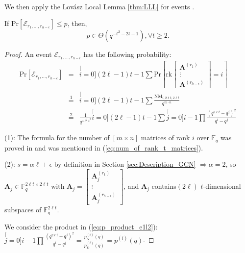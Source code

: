 We then apply the Lov\'asz Local Lemma \ref{thm:LLL} for events
.
\begin{lem}
\label{lem:p_e1l2} If $\mathrm{Pr}\left[\mathcal{E}_{r_{1},\ldots,r_{h-\epsilon}}\right]\leq p$,
then,
\[
p\in\Theta\left(q^{-t^{2}-2t-1}\right),\forall t\geq2.
\]
\end{lem}
\begin{proof}
An event $\mathcal{E}_{r_{1},\ldots,r_{h-\epsilon}}$ has the following
probability:
\begin{eqnarray}
\mathrm{Pr}\left[\mathcal{E}_{r_{1},\ldots,r_{h-\epsilon}}\right] & = & \stackrel[i=0]{\left(2\ell-1\right)t-1}{\mathop{\sum}}\mathrm{Pr}\left[\mathrm{rk}\left[\begin{array}{c}
\boldsymbol{A}^{\left(r_{1}\right)}\\
\vdots\\
\boldsymbol{A}^{\left(r_{h-\epsilon}\right)}
\end{array}\right]=i\right]\nonumber \\
 & \overset{1}{=} & \stackrel[i=0]{\left(2\ell-1\right)t-1}{\mathop{\sum}}\frac{\mathrm{NM}_{i,2\ell t,2\ell t}}{q^{m\cdot n}}\nonumber \\
 & \overset{2}{=} & \frac{1}{q^{4\ell^{2}t^{2}}}\stackrel[i=0]{\left(2\ell-1\right)t-1}{\mathop{\sum}}\stackrel[j=0]{i-1}{\mathop{\prod}}\frac{\left(q^{2\ell t}-q^{j}\right)^{2}}{q^{i}-q^{j}}\label{eq:p_product_e1l2}
\end{eqnarray}

(1): The formula for the number of $\left[m\times n\right]$ matrices
of rank $i$ over $\ensuremath{\mathbb{F}}_{q}$ was proved in \cite{Overbeck:2007}
and was mentioned in (\ref{eq:num_of_rank_t_matrices}).

(2): $s=\alpha\ell+\epsilon$ by definition in Section \ref{sec:Description_GCN}
$\Rightarrow\alpha=2$, so $\boldsymbol{A}_{j}\in\ensuremath{\mathbb{F}}_{q}^{2\ell t\times2\ell t}$
with $\boldsymbol{A}_{j}=\left[\begin{array}{c}
\boldsymbol{A}_{j}^{\left(r_{1}\right)}\\
\vdots\\
\boldsymbol{A}_{j}^{\left(r_{h-\epsilon}\right)}
\end{array}\right]$, and $\boldsymbol{A}_{j}$ contains$\left(2\ell\right)$ $t$-dimensional
subspaces of $\ensuremath{\mathbb{F}}_{q}^{2\ell t}$.

We consider the product in (\ref{eq:p_product_e1l2}): $\stackrel[j=0]{i-1}{\mathop{\prod}}\frac{\left(q^{2\ell t}-q^{j}\right)^{2}}{q^{i}-q^{j}}=\frac{p_{N}^{(i)}(q)}{p_{D}^{(i)}(q)}=p^{(i)}(q)$.


\end{proof}
